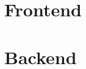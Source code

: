 \documentclass[12pt,twoside]{article}
\begin{document}


\tableofcontents


\clearpage

\clearpage

\clearpage

\clearpage

\clearpage

\clearpage

\clearpage

\section{Frontend}

\section{Backend}
\end{document}
